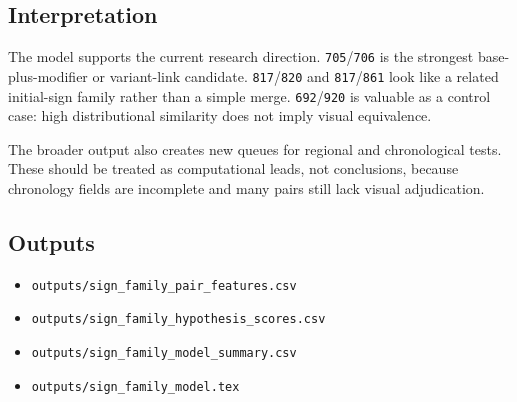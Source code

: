 \subsection{Interpretation}

The model supports the current research direction. \texttt{705}/\texttt{706} is the strongest base-plus-modifier or variant-link candidate. \texttt{817}/\texttt{820} and \texttt{817}/\texttt{861} look like a related initial-sign family rather than a simple merge. \texttt{692}/\texttt{920} is valuable as a control case: high distributional similarity does not imply visual equivalence.

The broader output also creates new queues for regional and chronological tests. These should be treated as computational leads, not conclusions, because chronology fields are incomplete and many pairs still lack visual adjudication.

\subsection{Outputs}

\begin{itemize}
  \item \texttt{outputs/sign\_family\_pair\_features.csv}
  \item \texttt{outputs/sign\_family\_hypothesis\_scores.csv}
  \item \texttt{outputs/sign\_family\_model\_summary.csv}
  \item \texttt{outputs/sign\_family\_model.tex}
\end{itemize}
